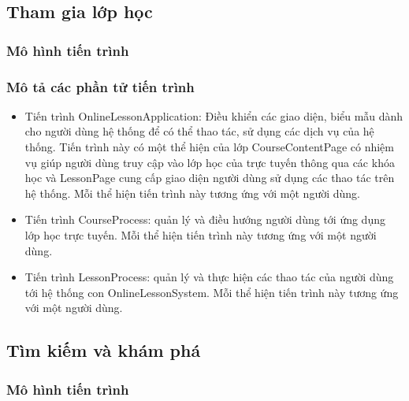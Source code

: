 \documentclass[./../main.tex]{subfiles}
\begin{document}
\subsection{Tham gia lớp học}

\subsubsection{Mô hình tiến trình}


\subsubsection{Mô tả các phần tử tiến trình}
\begin{itemize}
	\item Tiến trình OnlineLessonApplication: Điều khiển các giao diện, biểu mẫu dành cho người dùng hệ thống để có thể thao tác, sử dụng các dịch vụ của hệ thống. Tiến trình này có một thể hiện của lớp CourseContentPage có nhiệm vụ giúp người dùng truy cập vào lớp học của trực tuyến thông qua các khóa học và LessonPage cung cấp giao diện người dùng sử dụng các thao tác trên hệ thống.
	Mỗi thể hiện tiến trình này tương ứng với một người dùng.
	\item Tiến trình CourseProcess: quản lý và điều hướng người dùng tới ứng dụng lớp học trực tuyến.
	Mỗi thể hiện tiến trình này tương ứng với một người dùng.
	\item Tiến trình LessonProcess: quản lý và thực hiện các thao tác của người dùng tới  hệ thống con OnlineLessonSystem.
	Mỗi thể hiện tiến trình này tương ứng với một người dùng.
	
\end{itemize}

\subsection{Tìm kiếm và khám phá}

\subsubsection{Mô hình tiến trình}

\end{document}
